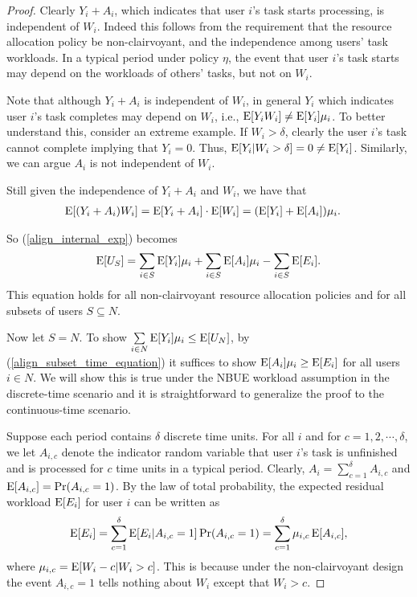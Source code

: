 \documentclass[prodmode,acmtompecs]{acmsmall}
\newcommand{\fullUserSet}{N}
\begin{document}
\begin{proof}
Clearly $Y_i + A_i$, which indicates that user $i$'s task starts processing, is independent of $W_i$. Indeed this follows from the requirement that the resource allocation policy be non-clairvoyant, and the independence among users' task workloads. In a typical period under policy $\eta$, the event that user $i$'s task starts may depend on the workloads of others' tasks, but not on $W_i$. 

Note that although $Y_i + A_i$ is independent of $W_i$, in general $Y_i$ which indicates user $i$'s task completes may depend on $W_i$, i.e., $\operatorname*{\mathrm{E}}[Y_i W_i] \neq \operatorname*{\mathrm{E}}[Y_i]\mu_i$. To better understand this, consider an extreme example. If $W_i > \delta$, clearly the user $i$'s task cannot complete implying that $Y_i = 0$. Thus, $\operatorname*{\mathrm{E}}[Y_i | W_i > \delta] = 0 \neq \operatorname*{\mathrm{E}}[Y_i]$. 
Similarly, we can argue $A_i$ is not independent of $W_i$. 

Still given the independence of $Y_i + A_i$ and $W_i$, we have that
\begin{align*}
\operatorname*{\mathrm{E}}[(Y_i + A_i) W_i] & = \operatorname*{\mathrm{E}}[Y_i + A_i] \cdot \operatorname*{\mathrm{E}}[W_i] = (\operatorname*{\mathrm{E}}[Y_i] + \operatorname*{\mathrm{E}}[A_i])\mu_i. 
\end{align*}

So (\ref{align_internal_exp}) becomes
\begin{align}
\label{align_subset_time_equation}
\operatorname*{\mathrm{E}}[U_S] = \sum\limits_{i\in S}\operatorname*{\mathrm{E}}[Y_i]\mu_i + \sum\limits_{i\in S}\operatorname*{\mathrm{E}}[A_i] \mu_i - \sum\limits_{i\in S} \operatorname*{\mathrm{E}}[E_i]. 
\end{align}
This equation holds for all non-clairvoyant resource allocation policies and for all subsets of users $S\subseteq \fullUserSet$. 


Now let $S = \fullUserSet$. To show $\sum\limits_{i\in \fullUserSet} \expectation[Y_i]\mu_i \leq \expectation[U_{\fullUserSet}]$, by (\ref{align_subset_time_equation}) it suffices to show $\operatorname*{\mathrm{E}}[A_i] \mu_i \geq \operatorname*{\mathrm{E}}[E_i]$ for all users $i\in \fullUserSet$. We will show this is true under the NBUE workload assumption in the discrete-time scenario and it is straightforward to generalize the proof to the continuous-time scenario. 

Suppose each period contains $\delta$ discrete time units. 
For all $i$ and for $c = 1, 2, \cdots, \delta$, we let $A_{i, c}$ denote the indicator random variable that user $i$'s task is unfinished and is processed for $c$ time units in a typical period. Clearly, $A_i = \sum\limits_{c = 1}^{\delta} A_{i, c}$ and $\operatorname*{\mathrm{E}}[A_{i, c}] = \Pr(A_{i, c} = 1)$. By the law of total probability, the expected residual workload $\operatorname*{\mathrm{E}}[E_i]$ for user $i$ can be written as
\begin{align}
\label{align_E_i_total_probability}
\operatorname*{\mathrm{E}}[E_i] = \sum\limits_{c = 1}^{\delta} \operatorname*{\mathrm{E}}[E_i | A_{i, c} = 1] \Pr(A_{i,c} = 1) = \sum\limits_{c = 1}^{\delta} \mu_{i,c} \operatorname*{\mathrm{E}}[A_{i, c}],
\end{align}
where $\mu_{i,c} = \operatorname*{\mathrm{E}}[W_i - c | W_i > c]$. 
This is because under the non-clairvoyant design the event $A_{i,c} = 1$ tells nothing about $W_i$ except that $W_i > c$. 


\end{proof}
\end{document}
